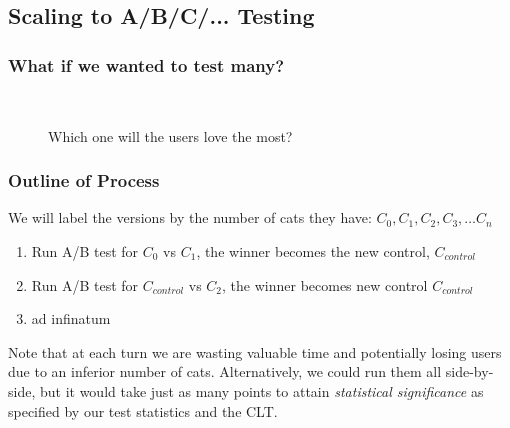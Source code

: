 \documentclass[]{beamer}
\theoremstyle{definition}
\begin{document}
\subsection{Scaling to A/B/C/... Testing}
\begin{frame}
\frametitle{What if we wanted to test many?}
\begin{figure}[ht!] 
\centering
{}\pause
{}\pause\\
\pause
{}
\caption{Which one will the users love the most?}
\end{figure}
\end{frame}


\begin{frame}
\frametitle{Outline of Process}
We will label the versions by the number of cats they have: $C_0, C_1, C_2, C_3, \ldots C_n$
\begin{enumerate}[<+->]
\item  Run A/B test for $C_0$ vs $C_1$, the winner becomes the new control, $C_{control}$
\item Run A/B test for $C_{control}$ vs $C_2$, the winner becomes new control $C_{control}$
\item ad infinatum
\end{enumerate}
Note that at each turn we are wasting valuable time and potentially losing users due to an inferior number of cats.  Alternatively, we could run them all side-by-side, but it would take just as many points to attain \emph{statistical significance} as specified by our test statistics and the CLT.
\end{frame}
\end{document}
